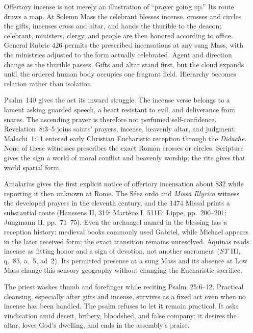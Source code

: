 
Offertory incense is not merely an illustration of ``prayer going up.'' Its route draws a map. At Solemn Mass the celebrant blesses incense, crosses and circles the gifts, incenses cross and altar, and hands the thurible to the deacon; celebrant, ministers, clergy, and people are then honored according to office. General Rubric 426 permits the prescribed incensations at any sung Mass, with the ministries adjusted to the form actually celebrated. Agent and direction change as the thurible passes. Gifts and altar stand first, but the cloud expands until the ordered human body occupies one fragrant field. Hierarchy becomes relation rather than isolation.

Psalm~140 gives the act its inward struggle. The incense verse belongs to a lament asking guarded speech, a heart resistant to evil, and deliverance from snares. The ascending prayer is therefore not perfumed self-confidence. Revelation~8:3--5 joins saints' prayers, incense, heavenly altar, and judgment; Malachi~1:11 entered early Christian Eucharistic reception through the \emph{Didache}. None of these witnesses prescribes the exact Roman crosses or circles. Scripture gives the sign a world of moral conflict and heavenly worship; the rite gives that world spatial form.

Amalarius gives the first explicit notice of offertory incensation about 832 while reporting it then unknown at Rome. The S\'eez ordo and \emph{Missa Illyrica} witness the developed prayers in the eleventh century, and the 1474 Missal prints a substantial route (Hanssens II, 319; Mart\`ene I, 511E; Lippe, pp.~200--201; Jungmann II, pp.~71--75). Even the archangel named in the blessing has a reception history: medieval books commonly used Gabriel, while Michael appears in the later received form; the exact transition remains unresolved. Aquinas reads incense as fitting honor and a sign of devotion, not another sacrament (\emph{ST} III, q.~83, a.~5, ad~2). Its permitted presence at a sung Mass and its absence at Low Mass change this sensory geography without changing the Eucharistic sacrifice.


The priest washes thumb and forefinger while reciting Psalm~25:6--12. Practical cleansing, especially after gifts and incense, survives as a fixed act even when no incense has been handled. The psalm refuses to let it remain practical. It asks vindication amid deceit, bribery, bloodshed, and false company; it desires the altar, loves God's dwelling, and ends in the assembly's praise.


